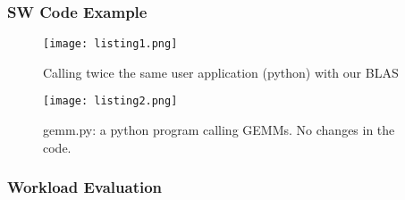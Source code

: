 \begin{frame}
	\frametitle{SW Code Example}

	\small
    \begin{figure}
        \centering
        \texttt{[image: listing1.png]}
	    \vspace{-3mm}
        \caption{Calling twice the same user application (python) with our BLAS}
    \end{figure}
	    \vspace{-2mm}

    \begin{figure}
        \centering
        \texttt{[image: listing2.png]}
	    \vspace{-3mm}
        \caption{gemm.py: a python program calling GEMMs. No changes in the code.}
    \end{figure}
	\normalsize

\end{frame}

\subsubsection{Workload Evaluation}
%
%

